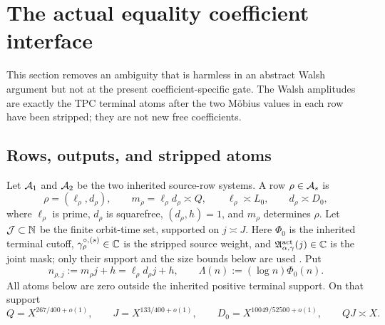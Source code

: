 \section{The actual equality coefficient interface}
\label{sec:tpc45-interface}

This section removes an ambiguity that is harmless in an abstract Walsh
argument but not at the present coefficient-specific gate.  The Walsh
amplitudes are exactly the TPC terminal atoms after the two M\"obius
values in each row have been stripped; they are not new free
coefficients.

\subsection{Rows, outputs, and stripped atoms}

Let \(\mathcal A_1\) and \(\mathcal A_2\) be the two inherited source-row systems.  A
row \(\rho\in\mathcal A_s\) is
\begin{equation}
 \rho=(\ell_\rho,d_\rho),
 \qquad
 m_\rho=\ell_\rho d_\rho\asymp Q,
 \qquad
 \ell_\rho\asymp L_0,
 \qquad
 d_\rho\asymp D_0,
 \label{eq:tpc45-row}
\end{equation}
where \(\ell_\rho\) is prime, \(d_\rho\) is squarefree,
\((d_\rho,h)=1\), and \(m_\rho\) determines \(\rho\).  Let
\(\mathcal J\subset\mathbb N\) be the finite orbit-time set, supported on
\(j\asymp J\).  Here \(\Phi_0\) is the inherited terminal cutoff,
\(\gamma_\rho^{\circ,(s)}\in\mathbb C\) is the stripped source weight, and
\(\mathfrak A_{\alpha,\gamma}^{\rm act}(j)\in\mathbb C\) is the joint mask;
only their support and the size bounds below are used
\citep{WangTPC43,WangTPC44}.  Put
\begin{equation}
 n_{\rho,j}:=m_\rho j+h=\ell_\rho d_\rho j+h,
 \qquad
 \Lambda(n):=(\log n)\Phi_0(n).
 \label{eq:tpc45-target-and-Lambda}
\end{equation}
All atoms below are zero outside the inherited positive terminal
support.  On that support
\begin{equation}
 Q=X^{267/400+o(1)},
 \qquad
 J=X^{133/400+o(1)},
 \qquad
 D_0=X^{10049/52500+o(1)},
 \qquad QJ\asymp X.
 \label{eq:tpc45-endpoint-scales}
\end{equation}

